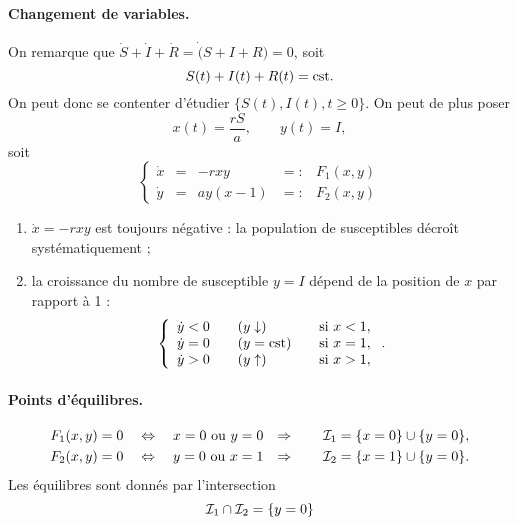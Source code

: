 \paragraph*{Changement de variables.}
On remarque que $\dot S + \dot I + \dot R = \dot (S + I + R) = 0$, soit 
$$
S(t) + I(t) + R(t) = \text{cst}.
$$
On peut donc se contenter d'étudier $\{S(t), I(t), t \geq 0\}$. On peut de plus poser 
$$
x(t) = \frac{rS}a, \qquad y(t) = I,
$$
soit
$$
\left\{\begin{array}{rclcl}
        \dot x & = & -r x y & =: & F_1(x, y) \\
        \dot y & = & a y (x - 1) & =: & F_2(x, y)
       \end{array}\right.
$$

\remarks
\begin{enumerate}
  \item $\dot x = - rxy$ est toujours négative : la population de susceptibles décroît systématiquement ; 
  \item la croissance du nombre de susceptible $y = I$ dépend de la position de $x$ par rapport à 1 :
  $$
  \left\{\begin{array}{lllll}
                \dot y < 0 & & (y \downarrow) & & \text{si } x < 1, \\
                \dot y = 0 & & (y = \text{cst}) & & \text{si } x = 1, \\
                \dot y > 0 & & (y \uparrow) & & \text{si } x > 1,
                \end{array}\right..
  $$
\end{enumerate}


\paragraph*{Points d'équilibres.}
\begin{align*}
  F_1(x, y) & = 0 \quad \Leftrightarrow \quad x = 0 \text{ ou } y = 0 &
  \Rightarrow \qquad \mathcal{I}_1 & = \{x = 0\} \cup \{y = 0\}, \\
  F_2(x, y) & = 0 \quad \Leftrightarrow \quad y = 0 \text{ ou } x = 1 &
  \Rightarrow \qquad \mathcal{I}_2 & = \{x = 1\} \cup \{y = 0\}.
\end{align*}
Les équilibres sont donnés par l'intersection 
$$
\mathcal{I}_1 \cap \mathcal{I}_2 = \{y = 0\}
$$

